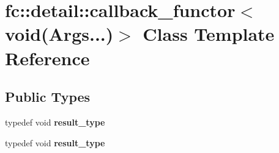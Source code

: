 \hypertarget{classfc_1_1detail_1_1callback__functor_3_01void_07_args_8_8_8_08_4}{}\section{fc\+:\+:detail\+:\+:callback\+\_\+functor$<$ void(Args...)$>$ Class Template Reference}
\label{classfc_1_1detail_1_1callback__functor_3_01void_07_args_8_8_8_08_4}
\subsection*{Public Types}
\begin{DoxyCompactItemize}
\item 
\mbox{\label{classfc_1_1detail_1_1callback__functor_3_01void_07_args_8_8_8_08_4_a6bf9e30682f6223c8628a6c170f1f45f}} 
typedef void {\bfseries result\+\_\+type}
\item 
\mbox{\label{classfc_1_1detail_1_1callback__functor_3_01void_07_args_8_8_8_08_4_a6bf9e30682f6223c8628a6c170f1f45f}} 
typedef void {\bfseries result\+\_\+type}
\end{DoxyCompactItemize}
